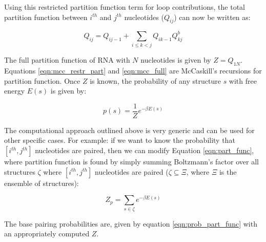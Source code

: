 Using this restricted partition function term for loop contributions, the total partition function between $i^{th}$ and $j^{th}$ nucleotides ($Q_{ij}$) can now be written as:

\begin{equation}
    Q_{ij} = Q_{i j-1} + \sum_{i \leq k <j} Q_{i k-1} Q_{kj}^b
    \label{eqn:mcc_full}
\end{equation}

The full partition function of RNA with $N$ nucleotides is given by $Z = Q_{1N}$. Equations \ref{eqn:mcc_restr_part} and \ref{eqn:mcc_full} are McCaskill's recursions for partition function. Once $Z$ is known, the probability of any structure $s$ with free energy $E(s)$ is given by:

\begin{equation}
\label{eqn:prob_part_func}
    p(s) = \frac{1}{Z} e^{-\beta E(s)}
\end{equation}

The computational approach outlined above is very generic and can be used for other specific cases. For example: if we want to know the probability that $[i^{th}, j^{th}]$ nucleotides are paired, then we can modify Equation \ref{eqn:part_func}, where partition function is found by simply summing Boltzmann's factor over all structures $\zeta$ where $[i^{th}, j^{th}]$ nucleotides are paired ($\zeta \subseteq \Xi$, where $\Xi$ is the ensemble of structures):

\begin{equation}
    Z_p = \sum_{s\in\zeta} e^{-\beta E(s)}
\end{equation}

The base pairing probabilities are, given by equation \ref{eqn:prob_part_func} with an appropriately computed $Z$. %
